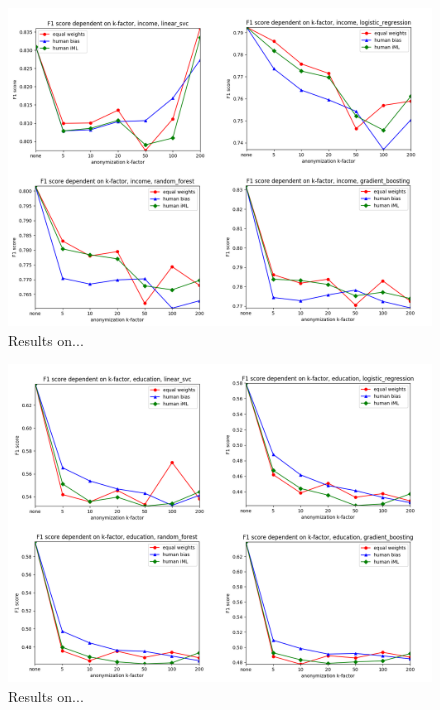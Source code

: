 \documentclass{llncs}
\begin{document}
\begin{figure}[!h]
	\begin{center}
		\vspace{-1.0cm}
		\hspace*{-0.8cm}
		\includegraphics[width=1.0\textwidth]{figures/income.png}
		\caption{Results on...}
		\label{fig:results_income}
	\end{center}
\end{figure}

\begin{figure}[!h]
	\begin{center}
		\vspace{-1.0cm}
		\hspace*{-0.8cm}
		\includegraphics[width=1.0\textwidth]{figures/education_num.png}
		\caption{Results on...}
		\label{fig:results_education}
	\end{center}
\end{figure}
\end{document}
